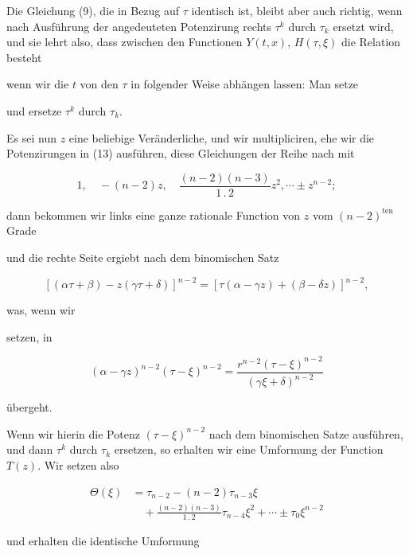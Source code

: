Die Gleichung (9), die in Bezug auf $\tau$ identisch ist, bleibt
aber auch richtig, wenn nach Ausf\"uhrung der angedeuteten
Potenzirung rechts $\tau^k$ durch $\tau_k$ ersetzt wird, und sie lehrt also,
dass zwischen den Functionen $Y(t, x)$, $H(\tau, \xi)$ die Relation besteht


wenn wir die $t$ von den $\tau$ in folgender Weise abh\"angen lassen:
Man setze


und ersetze  $\tau^k$ durch $\tau_k$.

Es sei nun $z$ eine beliebige Ver\"anderliche, und wir multipliciren,
ehe wir die Potenzirungen in (13) ausf\"uhren, diese
Gleichungen der Reihe nach mit

\[
1, \quad -(n-2)z, \quad \frac{(n-2)(n-3)}{1\,.\,2}z^2, \cdots \pm z^{n-2};
\]

dann bekommen wir links eine ganze rationale Function von $z$
vom $(n-2)^{\text{ten}}$ Grade


und die rechte Seite ergiebt nach dem binomischen Satz

\[
[(\alpha\tau+\beta) - z(\gamma\tau+\delta)]^{n-2} = [\tau(\alpha-\gamma z) + (\beta-\delta z)]^{n-2},
\]

was, wenn wir


setzen, in

\[
(\alpha-\gamma z)^{n-2}(\tau-\xi)^{n-2} = \frac{r^{n-2}(\tau-\xi)^{n-2}}{(\gamma\xi+\delta)^{n-2}}
\]

\"ubergeht.

Wenn wir hierin die Potenz $(\tau-\xi)^{n-2}$ nach dem binomischen
Satze ausf\"uhren, und dann $\tau^k$ durch $\tau_k$ ersetzen, so erhalten
wir eine Umformung der Function $T(z)$. Wir setzen also


\[
\begin{aligned}
\Theta(\xi) &= \tau_{n-2} - (n-2)\tau_{n-3}\xi\\
&\quad + \frac{(n-2)(n-3)}{1\,.\,2}\tau_{n-4}\xi^2 + \cdots \pm \tau_0\xi^{n-2}
\end{aligned}
\]

und erhalten die identische Umformung

